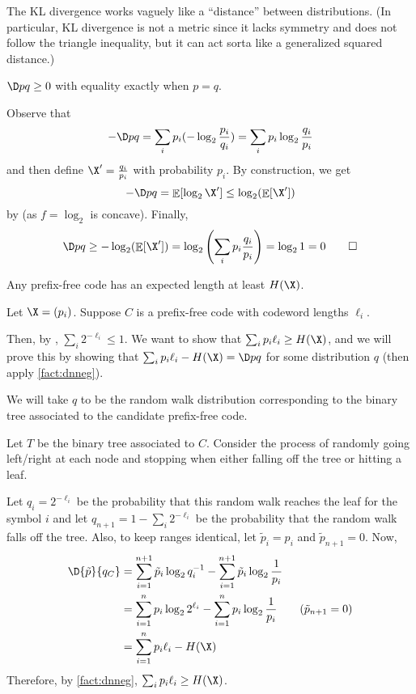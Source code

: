 \documentclass[class=co432,notes,tikz]{agony}
\DeclareMathOperator*{\E}{\mathbb{E}}
\begin{document}
The KL divergence works vaguely like a ``distance'' between distributions.
(In particular, KL divergence is not a metric since it lacks symmetry
and does not follow the triangle inequality,
but it can act sorta like a generalized squared distance.)

\begin{fact}\label{fact:dnneg}
  $\D p q \geq 0$ with equality exactly when $p = q$.
\end{fact}
\begin{prf}
  Observe that
  \[ -\D p q = \sum_i p_i(-\log_2\frac{p_i}{q_i}) = \sum_i p_i \log_2 \frac{q_i}{p_i} \]
  and then define $\X' = \frac{q_i}{p_i}$ with probability $p_i$.
  By construction, we get
  \[ -\D p q = \E[\log_2 \X'] \leq \log_2(\E[\X']) \]
  by  (as $f = \log_2$ is concave).
  Finally,
  \[ \D p q \geq -\log_2(\E[\X']) = \log_2\qty(\sum_i p_i \frac{q_i}{p_i}) = \log_2 1 = 0  \qedhere \]
\end{prf}

\begin{prop}
  Any prefix-free code has an expected length at least $H(\X)$.
\end{prop}
\begin{prf}
  Let $\X = (p_i)$.
  Suppose $C$ is a prefix-free code with codeword lengths $\ell_i$.

  Then, by , $\sum_i 2^{-\ell_i} \leq 1$.
  We want to show that $\sum_i p_i \ell_i \geq H(\X)$,
  and we will prove this by showing that $\sum_i p_i \ell_i - H(\X) =
    \D p q$ for some distribution $q$
  (then apply \cref{fact:dnneg}).

  We will take $q$ to be the random walk distribution corresponding to the binary tree
  associated to the candidate prefix-free code.

  Let $T$ be the binary tree associated to $C$.
  Consider the process of randomly going left/right at each node
  and stopping when either falling off the tree or hitting a leaf.

  Let $q_i = 2^{-\ell_i}$ be the probability that this random walk reaches the leaf for the symbol $i$
  and let $q_{n+1} = 1-\sum_i 2^{-\ell_i}$ be the probability that the random walk falls off the tree.
  Also, to keep ranges identical, let $\tilde p_i = p_i$ and $\tilde p_{n+1} = 0$. Now,
  \begin{align*}
    \D{\tilde p}{q_C}
     & = \sum_{i=1}^{n+1} \tilde p_i \log_2 q_i^{-1} - \sum_{i=1}^{n+1} \tilde p_i \log_2 \frac{1}{p_i}      \\
     & = \sum_{i=1}^n p_i \log_2 2^{\ell_i} - \sum_{i=1}^n p_i \log_2 \frac{1}{p_i} \tag{$\tilde p_{n+1}=0$} \\
     & = \sum_{i=1}^n p_i \ell_i - H(\X)
  \end{align*}
  Therefore, by \cref{fact:dnneg}, $\sum_i p_i \ell_i \geq H(\X)$.
\end{prf}
\end{document}
